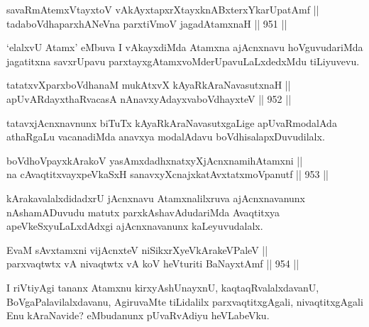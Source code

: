 \begin{shl}
savaRmAtemxVtayxtoV vAkAyxtapxrXtayxknABxterxYkarUpatAmf ||  \\
tadaboVdhaparxhANeVna parxtiVmoV jagadAtamxnaH \hfill || 951 ||  
\end{shl}

\begin{artha}
`elalxvU Atamx' eMbuva I vAkayxdiMda Atamxna ajAcnxnavu hoVguvudariMda jagatitxna savxrUpavu parxtayxgAtamxvoMderUpavuLaLxdedxMdu tiLiyuvevu.
\end{artha}

\begin{shl}
tatatxvXparxboVdhanaM mukAtxvX kAyaRkAraNavasutxnaH || \\
apUvARdayxthaRvacasA nAnavxyAdayxvaboVdhayxteV \hfill || 952 ||  
\end{shl}

\begin{artha}
tatavxjAcnxnavnunx biTuTx kAyaRkAraNavasutxgaLige apUvaRmodalAda athaRgaLu vacanadiMda anavxya modalAdavu boVdhisalapxDuvudilalx.
\end{artha}


\begin{shl}
boVdhoV\s payxkArakoV yasAmxdadhxnatxyXjAcnxnamihA\s \s tamxni || \\
na cA\s \s vaqtitxvayxpeVkaSxH sanavxyXcnajxkatAvxtatxmoVpanutf \hfill || 953 ||  
\end{shl}

\begin{artha}
kArakavalalxdidadxrU jAcnxnavu Atamxnalilxruva ajAcnxnavanunx nAshamADuvudu matutx parxkAshavAdudariMda Avaqtitxya apeVkeSxyuLaLxdAdxgi ajAcnxnavanunx kaLeyuvudalalx.
\end{artha}


\begin{shl}
EvaM sAvxtamxni vijAcnxteV niSikxrXyeV\s kArakeV\s PaleV || \\
parxvaqtwtx vA nivaqtwtx vA koV heVturiti BaNayxtAmf \hfill || 954 ||  
\end{shl}

\begin{artha}
I riVtiyAgi tananx Atamxnu kirxyAshUnayxnU, kaqtaqRvalalxdavanU, BoVgaPalavilalxdavanu, AgiruvaMte tiLidalilx parxvaqtitxgAgali, nivaqtitxgAgali Enu kAraNavide? eMbudanunx pUvaRvAdiyu heVLabeVku.
\end{artha}

